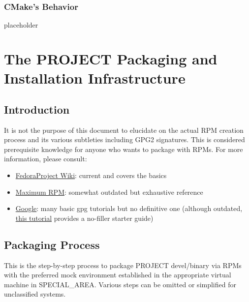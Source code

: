 \documentclass[12pt,letterpaper]{article}
\begin{document}
\subsubsection{CMake's Behavior}

placeholder

\section{The PROJECT Packaging and Installation Infrastructure}

\subsection{Introduction}

It is not the purpose of this document to elucidate on the actual RPM creation process and its various subtleties including GPG2 signatures.  This is considered prerequisite knowledge for anyone who wants to package with RPMs.  For more information, please consult:

\begin{itemize}
\item \href{http://fedoraproject.org/wiki/How_to_create_an_RPM_package}{FedoraProject Wiki}: current and covers the basics
\item \href{http://www.rpm.org/max-rpm/}{Maximum RPM}: somewhat outdated but exhaustive reference
\item \href{http://www.google.com}{Google}: many basic gpg tutorials but no definitive one (although outdated, \href{http://fedoranews.org/tchung/gpg/}{this tutorial} provides a no-filler starter guide)
\end{itemize}

\subsection{Packaging Process}

This is the step-by-step process to package PROJECT devel/binary via RPMs with the preferred mock environment established in the appropriate virtual machine in SPECIAL_AREA.  Various steps can be omitted or simplified for unclassified systems.
\end{document}
